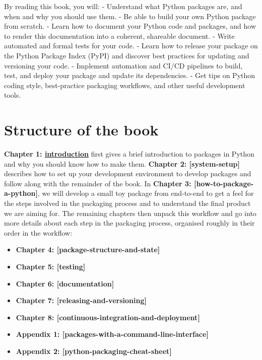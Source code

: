 \documentclass[
]{krantz}
\providecommand{\tightlist}{%
  \setlength{\itemsep}{0pt}\setlength{\parskip}{0pt}}
\begin{document}
By reading this book, you will:
- Understand what Python packages are, and when and why you should use them.
- Be able to build your own Python package from scratch.
- Learn how to document your Python code and packages, and how to render this documentation into a coherent, shareable document.
- Write automated and formal tests for your code.
- Learn how to release your package on the Python Package Index (PyPI) and discover best practices for updating and versioning your code.
- Implement automation and CI/CD pipelines to build, test, and deploy your package and update its dependencies.
- Get tips on Python coding style, best-practice packaging workflows, and other useful development tools.

\hypertarget{structure-of-the-book}{%
\section*{Structure of the book}\label{structure-of-the-book}}


\textbf{Chapter 1: \protect\hyperlink{introduction}{introduction}} first gives a brief introduction to packages in Python and why you should know how to make them. \textbf{Chapter 2: {[}system-setup{]}} describes how to set up your development environment to develop packages and follow along with the remainder of the book. In \textbf{Chapter 3: {[}how-to-package-a-python{]}}, we will develop a small toy package from end-to-end to get a feel for the steps involved in the packaging process and to understand the final product we are aiming for. The remaining chapters then unpack this workflow and go into more details about each step in the packaging process, organised roughly in their order in the workflow:

\begin{itemize}
\tightlist
\item
  \textbf{Chapter 4: {[}package-structure-and-state{]}}
\item
  \textbf{Chapter 5: {[}testing{]}}
\item
  \textbf{Chapter 6: {[}documentation{]}}
\item
  \textbf{Chapter 7: {[}releasing-and-versioning{]}}
\item
  \textbf{Chapter 8: {[}continuous-integration-and-deployment{]}}
\item
  \textbf{Appendix 1: {[}packages-with-a-command-line-interface{]}}
\item
  \textbf{Appendix 2: {[}python-packaging-cheat-sheet{]}}
\end{itemize}
\end{document}

